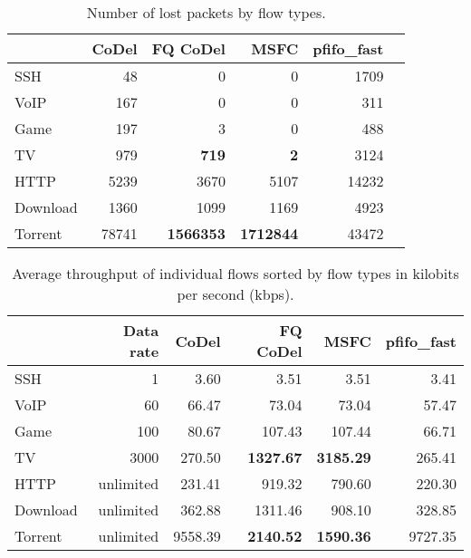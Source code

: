 \begin{table}
	\centering
	
	\begin{tabular}{@{}l|rrrrr@{}}
		\toprule
		         & {CoDel} &   {FQ CoDel} &       {MSFC} & {pfifo\_fast} &  \\ \midrule
		SSH      &      48 &            0 &            0 &          1709 &  \\
		VoIP     &     167 &            0 &            0 &           311 &  \\
		Game     &     197 &            3 &            0 &           488 &  \\
		TV       &     979 &     \bf{719} &       \bf{2} &          3124 &  \\
		HTTP     &    5239 &         3670 &         5107 &         14232 &  \\
		Download &    1360 &         1099 &         1169 &          4923 &  \\
		Torrent  &   78741 & \bf{1566353} & \bf{1712844} &         43472 &  \\ \bottomrule
	\end{tabular}
	\caption{Number of lost packets by flow types.}
	\label{tab:loss_A}
\end{table}

\begin{table}
	\centering
	
	\begin{tabular}{@{}l|rrrrr@{}}
		\toprule
		         & {Data rate} & {CoDel} &   {FQ CoDel} &       {MSFC} & {pfifo\_fast} \\ \midrule
		SSH      &           1 &    3.60 &         3.51 &         3.51 &          3.41 \\
		VoIP     &          60 &   66.47 &        73.04 &        73.04 &         57.47 \\
		Game     &         100 &   80.67 &       107.43 &       107.44 &         66.71 \\
		TV       &        3000 &  270.50 & \bf{1327.67} & \bf{3185.29} &        265.41 \\
		HTTP     &   unlimited &  231.41 &       919.32 &       790.60 &        220.30 \\
		Download &   unlimited &  362.88 &      1311.46 &       908.10 &        328.85 \\
		Torrent  &   unlimited & 9558.39 & \bf{2140.52} & \bf{1590.36} &       9727.35 \\ \bottomrule
	\end{tabular}
	\caption{Average throughput of individual flows sorted by flow types in kilobits per second (kbps).}
	\label{tab:throughput_A}
\end{table}









